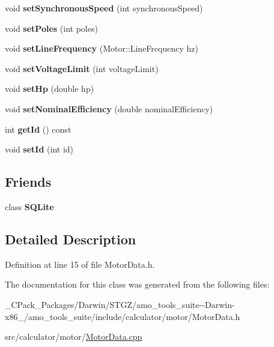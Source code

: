 \begin{DoxyCompactItemize}
\mbox{\label{class_motor_data_ade2574702a50e2be835c5204ead50479}} 
void {\bfseries set\+Synchronous\+Speed} (int synchronous\+Speed)
\item 
\mbox{\label{class_motor_data_a62f02ca68370ee2a7182671eb035dbe2}} 
void {\bfseries set\+Poles} (int poles)
\item 
\mbox{\label{class_motor_data_ae7e4126c99e06bf519040f6641a49b85}} 
void {\bfseries set\+Line\+Frequency} (Motor\+::\+Line\+Frequency hz)
\item 
\mbox{\label{class_motor_data_a7be5a2f208a11a3955d4cb2e0b122901}} 
void {\bfseries set\+Voltage\+Limit} (int voltage\+Limit)
\item 
\mbox{\label{class_motor_data_a2d8f0cc129df3330598922a61e399639}} 
void {\bfseries set\+Hp} (double hp)
\item 
\mbox{\label{class_motor_data_a78d378a3795ba0b7bd9e11ef4188e7f5}} 
void {\bfseries set\+Nominal\+Efficiency} (double nominal\+Efficiency)
\item 
\mbox{\label{class_motor_data_ac67a3f78e851968c9979e60cbf0f495b}} 
int {\bfseries get\+Id} () const
\item 
\mbox{\label{class_motor_data_ae26351f2cfd4e0acbd413b008ac2759f}} 
void {\bfseries set\+Id} (int id)
\end{DoxyCompactItemize}
\subsection*{Friends}
\begin{DoxyCompactItemize}
\item 
\mbox{\label{class_motor_data_a0102f3b3c0cbf96db6c49f071fa5e7cc}} 
class {\bfseries S\+Q\+Lite}
\end{DoxyCompactItemize}


\subsection{Detailed Description}


Definition at line 15 of file Motor\+Data.\+h.



The documentation for this class was generated from the following files\+:\begin{DoxyCompactItemize}
\item 
\+\_\+\+C\+Pack\+\_\+\+Packages/\+Darwin/\+S\+T\+G\+Z/amo\+\_\+tools\+\_\+suite-\/-\/\+Darwin-\/x86\+\_/amo\+\_\+tools\+\_\+suite/include/calculator/motor/Motor\+Data.\+h\item 
src/calculator/motor/\hyperlink{_motor_data_8cpp}{Motor\+Data.\+cpp}\end{DoxyCompactItemize}
